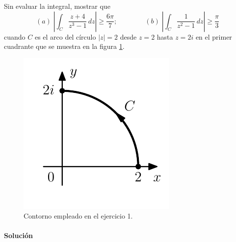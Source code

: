 \documentclass[a4paper]{report}
\begin{document}
Sin evaluar la integral, mostrar que 
\[
 (\textit{a})\;\left|\int_C\frac{z+4}{z^3-1}\,dz\right|\geq\frac{6\pi}{7};\qquad\qquad (\textit{b})\;\left|\int_C\frac{1}{z^2-1}\,dz\right|\geq\frac{\pi}{3}
\]
cuando \(C\) es el arco del círculo \(|z|=2\) desde \(z=2\) hasta \(z=2i\) en el primer cuadrante que se muestra en la figura \ref{fig:exercise_47_01}.
\begin{figure}[!htb]
 \begin{minipage}[c]{0.24\textwidth}
  \includegraphics[width=\textwidth]{figuras/exercise_47_01.pdf}
 \end{minipage}\hfill
 \begin{minipage}[c]{0.66\textwidth}
  \caption{
    Contorno empleado en el ejercicio 1.
    }\label{fig:exercise_47_01}
 \end{minipage}
\end{figure}

\paragraph{Solución} 
\end{document}

